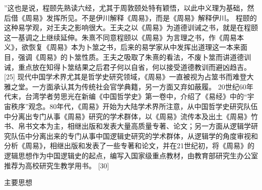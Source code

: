 \documentclass[a4paper,12pt,UTF8,twoside]{ctexbook}
\begin{document}
”这也是说，程颐先熟读六经，尤其于周敦颐处特有颖悟，以此中义理为基础，然后借《周易》发挥所见。不是伊川解释《周易》，而是《周易》解释伊川。
程颐的这种易学观，对王夫之影响很大。王夫之以《周易》为道德训诫之书，就是在程颐这一基调之上继续延伸。朱熹不同意程颐以《周易》为言理之书，作《周易本义》，欲恢复《周易》本为卜筮之书，后来的易学家从中发挥出道理这一本来面目，强调《周易》的卜筮性质。王夫之吸取了朱熹的看法，不废卜筮而讲道德训诫，重点放在知得卜筮结果之后君子何以自省，何以接受道德教训而避凶趋吉。 [25]
现代中国学术界尤其是哲学史研究领域，《周易》一直被视为占筮书而难登大雅之堂。一方面承认其为传统社会官学典籍，另一方面又弃如蔽履。
20世纪60年代末，台湾学者劳思光在新编《中国哲学史》第一卷中，介绍了《易经》中的“宇宙秩序”观念。80年代，《周易》开始为大陆学术界所注意，从中国哲学史研究队伍中分离出专门从事《周易》研究的学术群体，以《周易》流传本及出土《周易》竹书、帛书文本为主，相继出版和发表大量高质量专著、论文；另一方面从逻辑学研究队伍中分离出来的专门从事中国逻辑史研究的学术群体，从逻辑学的角度审视和分析《周易》，相继出版和发表了一些专著和论文，并在21世纪初，将《周易》的逻辑思想作为中国逻辑史的起点，编写入国家级重点教材，由教育部研究生办公室推荐为高校研究生教学用书。 [30]

主要思想
\end{document}
